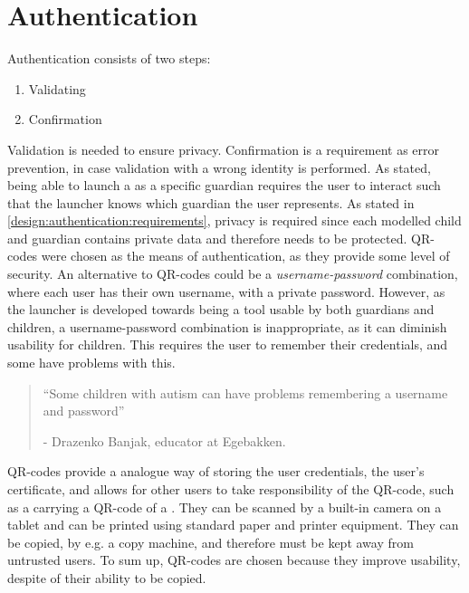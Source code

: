 \section{Authentication}
\label{design:authentication}
\label{design:authentication:requirements}
\label{design:authentication:solution}

\noindent Authentication consists of two steps:
\begin{enumerate}
	\item Validating
	\item Confirmation
\end{enumerate}
Validation is needed to ensure privacy. Confirmation is a requirement as error prevention, in case validation with a wrong identity is performed.
As stated, being able to launch a \girafapp[] as a specific guardian requires the user to interact such that the launcher knows which guardian the user represents.
As stated in \autoref{design:authentication:requirements}, privacy is required since each modelled child and guardian contains private data and therefore needs to be protected.
QR-codes were chosen as the means of authentication, as they provide some level of security.
An alternative to QR-codes could be a \emph{username-password} combination, where each user has their own username, with a private password.
However, as the launcher is developed towards being a tool usable by both guardians and children, a username-password combination is inappropriate, as it can diminish usability for children.
This requires the user to remember their credentials, and some \autists[] have problems with this.

\begin{quotation}
``Some children with autism can have problems remembering a username and password''\\ 
	\begin{flushright}
		- Drazenko Banjak, educator at Egebakken.
	\end{flushright}
\end{quotation}

QR-codes provide a analogue way of storing the user credentials, the user's certificate, and allows for other users to take responsibility of the QR-code, such as a \guardian[] carrying a QR-code of a \autist[].
They can be scanned by a built-in camera on a tablet and can be printed using standard paper and printer equipment. 
They can be copied, by e.g. a copy machine, and therefore must be kept away from untrusted users.
To sum up, QR-codes are chosen because they improve usability, despite of their ability to be copied. 

